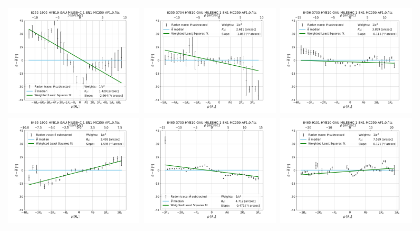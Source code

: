 \begin{figure}
    \includegraphics[width=0.31\textwidth]{Images/WLSFITS/CC1/8252-1902.png}
    \includegraphics[width=0.31\textwidth]{Images/WLSFITS/CC1/8255-3704.png}
    \includegraphics[width=0.31\textwidth]{Images/WLSFITS/CC1/8456-3703.png}
    \includegraphics[width=0.31\textwidth]{Images/WLSFITS/CC1/8465-1902.png}
    \includegraphics[width=0.31\textwidth]{Images/WLSFITS/CC1/8465-3703.png}
    \includegraphics[width=0.31\textwidth]{Images/WLSFITS/CC1/8465-9101.png}

\end{figure}
